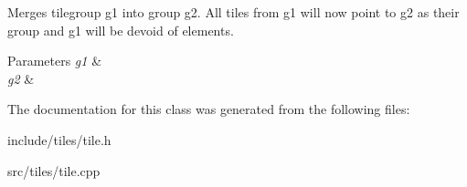 Merges tilegroup g1 into group g2. All tiles from g1 will now point to g2 as their group and g1 will be devoid of elements. 
\begin{DoxyParams}{Parameters}
{\em g1} & \\
\hline
{\em g2} & \\
\hline
\end{DoxyParams}


The documentation for this class was generated from the following files\-:\begin{DoxyCompactItemize}
\item 
include/tiles/tile.\-h\item 
src/tiles/tile.\-cpp\end{DoxyCompactItemize}
